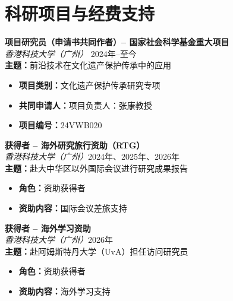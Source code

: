 \section*{科研项目与经费支持}

\noindent \textbf{项目研究员（申请书共同作者）-- 国家社会科学基金重大项目} \\
\textit{香港科技大学（广州）} \hfill 2024年--至今\\
\textbf{主题：}前沿技术在文化遗产保护传承中的应用
\begin{itemize}[leftmargin=*]
  \item \textbf{项目类别：}文化遗产保护传承研究专项
  \item \textbf{共同申请人：}项目负责人：张康教授
  \item \textbf{项目编号：}24VWB020
\end{itemize}

\noindent\textbf{获得者 -- 海外研究旅行资助（RTG）} \\
\textit{香港科技大学（广州）}\hfill 2024年、2025年、2026年\\
\textbf{主题：}赴大中华区以外国际会议进行研究成果报告
\begin{itemize}[leftmargin=*]
  \item \textbf{角色：}资助获得者
  \item \textbf{资助内容：}国际会议差旅支持
\end{itemize}

\noindent\textbf{获得者 -- 海外学习资助} \\
\textit{香港科技大学（广州）}\hfill 2026年\\
\textbf{主题：}赴阿姆斯特丹大学（UvA）担任访问研究员
\begin{itemize}[leftmargin=*]
  \item \textbf{角色：}资助获得者
  \item \textbf{资助内容：}海外学习支持
\end{itemize}
